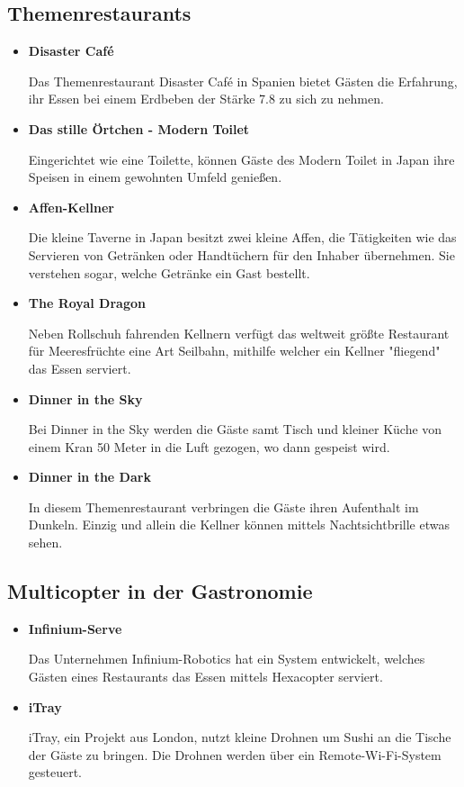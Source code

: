   \subsection*{Themenrestaurants}
  \begin{itemize}
    \item \textbf{Disaster Café}

    Das Themenrestaurant Disaster Café in Spanien bietet Gästen die Erfahrung, ihr Essen bei einem Erdbeben
    der Stärke 7.8 zu sich zu nehmen.

    \item \textbf{Das stille Örtchen - Modern Toilet}

    Eingerichtet wie eine Toilette, können Gäste des Modern Toilet in Japan ihre Speisen in einem gewohnten Umfeld genießen.

    \item \textbf{Affen-Kellner}

    Die kleine Taverne in Japan besitzt zwei kleine Affen, die Tätigkeiten wie das Servieren von Getränken oder Handtüchern
    für den Inhaber übernehmen. Sie verstehen sogar, welche Getränke ein Gast bestellt.

    \item \textbf{The Royal Dragon}

    Neben Rollschuh fahrenden Kellnern verfügt das weltweit größte Restaurant für Meeresfrüchte eine
    Art Seilbahn, mithilfe welcher ein Kellner "fliegend" das Essen serviert.

    \item \textbf{Dinner in the Sky}

    Bei Dinner in the Sky werden die Gäste samt Tisch und kleiner Küche von einem Kran 50 Meter
    in die Luft gezogen, wo dann gespeist wird.

    \item \textbf{Dinner in the Dark}

    In diesem Themenrestaurant verbringen die Gäste ihren Aufenthalt im Dunkeln. Einzig und allein die
    Kellner können mittels Nachtsichtbrille etwas sehen.
  \end{itemize}

  \subsection*{Multicopter in der Gastronomie}
  \begin{itemize}
      \item \textbf{Infinium-Serve}

      Das Unternehmen Infinium-Robotics hat ein System entwickelt, welches Gästen eines Restaurants
      das Essen mittels Hexacopter serviert.

      \item \textbf{iTray}

      iTray, ein Projekt aus London, nutzt kleine Drohnen um Sushi an die Tische der Gäste zu bringen.
      Die Drohnen werden über ein Remote-Wi-Fi-System gesteuert.

  \end{itemize}

